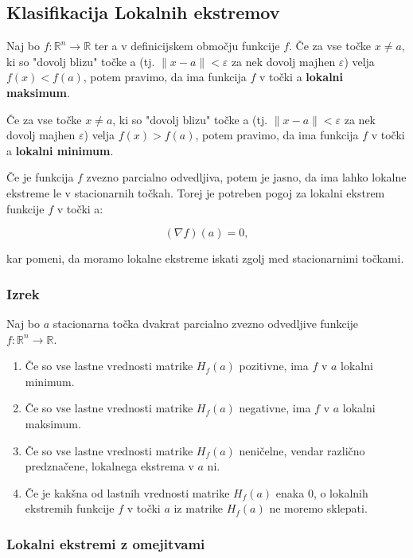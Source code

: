 \documentclass{article}
\begin{document}
\begin{multicols}{2}
\subsection{Klasifikacija Lokalnih ekstremov}

Naj bo \( f: \mathbb{R}^n \rightarrow \mathbb{R} \) ter a v definicijskem območju funkcije \( f \).
Če za vse točke \( x \neq a \), ki so "dovolj blizu" točke a (tj. \( \| x - a \| < \varepsilon \) za nek dovolj majhen \( \varepsilon \)) velja \( f(x) < f(a) \), 
potem pravimo, da ima funkcija \( f \) v točki a \textbf{lokalni maksimum}.

Če za vse točke \( x \neq a \), ki so "dovolj blizu" točke a (tj. \( \| x - a \| < \varepsilon \) za nek dovolj majhen \( \varepsilon \)) velja \( f(x) > f(a) \), 
potem pravimo, da ima funkcija \( f \) v točki a \textbf{lokalni minimum}.

Če je funkcija \( f \) zvezno parcialno odvedljiva, potem je jasno, da ima lahko lokalne ekstreme le v stacionarnih točkah. Torej je potreben pogoj za lokalni ekstrem funkcije \( f \) v točki a:

\[ (\nabla f)(a) = 0, \]

kar pomeni, da moramo lokalne ekstreme iskati zgolj med stacionarnimi točkami.

\subsubsection{Izrek}
Naj bo \( a \) stacionarna točka dvakrat parcialno zvezno odvedljive funkcije \( f: \mathbb{R}^n \rightarrow \mathbb{R} \).

\begin{enumerate}
    \item Če so vse lastne vrednosti matrike \( H_f(a) \) pozitivne, ima \( f \) v \( a \) lokalni minimum.
    \item Če so vse lastne vrednosti matrike \( H_f(a) \) negativne, ima \( f \) v \( a \) lokalni maksimum.
    \item Če so vse lastne vrednosti matrike \( H_f(a) \) neničelne, vendar različno predznačene, lokalnega ekstrema v \( a \) ni.
    \item Če je kakšna od lastnih vrednosti matrike \( H_f(a) \) enaka 0, o lokalnih ekstremih funkcije \( f \) v točki \( a \) iz matrike \( H_f(a) \) ne moremo sklepati.
\end{enumerate}


\subsubsection{Lokalni ekstremi z omejitvami}


\end{multicols}
\end{document}
